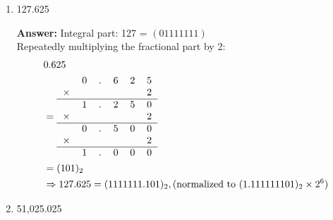 \documentclass[12pt]{article}
\begin{document}
\begin{enumerate}
\begin{enumerate}
      \item 127.625

      \textbf{Answer:}
      Integral part: 127 = $(0111 1111)$ \\
      Repeatedly multiplying the fractional part by 2:
      \begin{align*}
        & 0.625 \\
        &= \begin{tabular}{cccccc}
          & 0 & . & 6 & 2 & 5 \\
        $\times$ & & & & & 2 \\
        \hline
          & 1 & . & 2 & 5 & 0 \\
        $\times$ & & & & & 2 \\
        \hline
          & 0 & . & 5 & 0 & 0 \\
        $\times$ & & & & & 2 \\
        \hline
          & 1 & . & 0 & 0 & 0 \\
        \end{tabular} \\
        &= (101)_2 \\
        &\Rightarrow 127.625 = (1111111.101)_2, \text{(normalized to} \ (1.111111101)_2 \times 2^{6})
      \end{align*}

      \item 51,025.025


\end{enumerate}
\end{enumerate}
\end{document}
